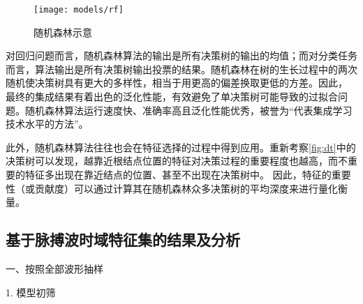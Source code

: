 \begin{figure}[htbp]
    \centering
    \texttt{[image: models/rf]}
    \caption{\label{fig:rf}随机森林示意}
\end{figure}

对回归问题而言，随机森林算法的输出是所有决策树的输出的均值；而对分类任务而言，算法输出是所有决策树输出投票的结果。随机森林在树的生长过程中的两次随机使决策树具有更大的多样性，相当于用更高的偏差换取更低的方差。因此，
最终的集成结果有着出色的泛化性能，有效避免了单决策树可能导致的过拟合问题。随机森林算法运行速度快、准确率高且泛化性能优秀，被誉为“代表集成学习技术水平的方法”\cite{Zhou2016,Liu2018}。

此外，随机森林算法往往也会在特征选择的过程中得到应用\cite{Aurélien2018}。重新考察\autoref{fig:dt}中的决策树可以发现，越靠近根结点位置的特征对决策过程的重要程度也越高，而不重要的特征多出现在靠近结点的位置、甚至不出现在决策树中。
因此，特征的重要性（或贡献度）可以通过计算其在随机森林众多决策树的平均深度来进行量化衡量。
\subsection{基于脉搏波时域特征集的结果及分析}
一、按照全部波形抽样

1. 模型初筛

